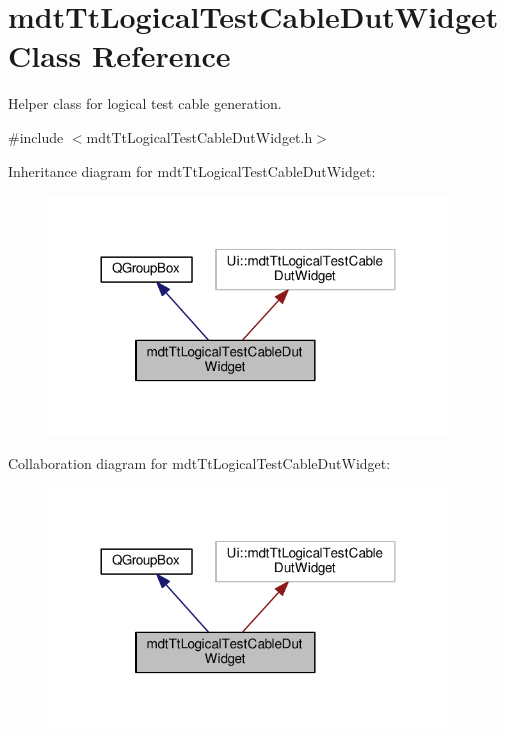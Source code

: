 \hypertarget{classmdt_tt_logical_test_cable_dut_widget}{\section{mdt\-Tt\-Logical\-Test\-Cable\-Dut\-Widget Class Reference}
\label{classmdt_tt_logical_test_cable_dut_widget}
}


Helper class for logical test cable generation.  




{\ttfamily \#include $<$mdt\-Tt\-Logical\-Test\-Cable\-Dut\-Widget.\-h$>$}



Inheritance diagram for mdt\-Tt\-Logical\-Test\-Cable\-Dut\-Widget\-:\nopagebreak
\begin{figure}[H]
\begin{center}
\leavevmode
\includegraphics[width=300pt]{classmdt_tt_logical_test_cable_dut_widget__inherit__graph}
\end{center}
\end{figure}


Collaboration diagram for mdt\-Tt\-Logical\-Test\-Cable\-Dut\-Widget\-:\nopagebreak
\begin{figure}[H]
\begin{center}
\leavevmode
\includegraphics[width=300pt]{classmdt_tt_logical_test_cable_dut_widget__coll__graph}
\end{center}
\end{figure}
